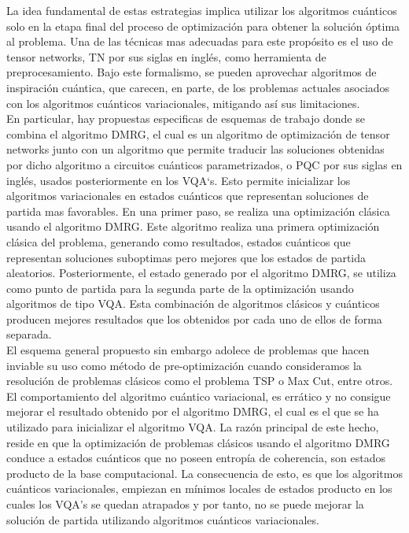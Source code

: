 \newpage

La idea fundamental de estas estrategias implica utilizar los algoritmos cuánticos solo en la etapa final del proceso de optimización para obtener la solución óptima al problema. Una de las técnicas mas adecuadas para este propósito es el uso de tensor networks, TN por sus siglas en inglés, como herramienta de preprocesamiento. Bajo este formalismo, se pueden aprovechar algoritmos de inspiración cuántica, que carecen, en parte, de los problemas actuales asociados con los algoritmos cuánticos variacionales, mitigando así sus limitaciones. \\

En particular, hay propuestas especificas de esquemas de trabajo donde se combina el algoritmo DMRG, el cual es un algoritmo de optimización de tensor networks junto con un algoritmo que permite traducir las soluciones obtenidas por dicho algoritmo a circuitos cuánticos parametrizados, o \mbox{PQC} por sus siglas en inglés, usados posteriormente en los VQA`s. Esto permite inicializar los algoritmos variacionales en estados cuánticos que representan soluciones de partida mas favorables. En una primer paso, se realiza una optimización clásica usando el algoritmo DMRG. Este algoritmo realiza una primera optimización clásica del problema, generando como resultados, estados cuánticos que representan soluciones suboptimas pero mejores que los estados de partida aleatorios. Posteriormente, el estado generado por el algoritmo DMRG, se utiliza como punto de partida para la segunda parte de la optimización usando algoritmos de tipo VQA. Esta combinación de algoritmos clásicos y cuánticos producen mejores resultados que los obtenidos por cada uno de ellos de forma separada. \\

El esquema general propuesto sin embargo adolece de problemas que hacen inviable su uso como método de pre-optimización cuando consideramos la resolución de problemas clásicos como el problema TSP o Max Cut, entre otros. El comportamiento del algoritmo cuántico variacional, es errático y no consigue mejorar el resultado obtenido por el algoritmo DMRG, el cual es el que se ha utilizado para inicializar el algoritmo VQA. La razón principal de este hecho, reside en que la optimización de problemas clásicos usando el algoritmo DMRG conduce a estados cuánticos que no poseen entropía de coherencia, son estados producto de la base computacional. La consecuencia de esto, es que los algoritmos cuánticos variacionales, empiezan en mínimos locales de estados producto en los cuales los VQA's se quedan atrapados y por tanto, no se puede mejorar la solución de partida utilizando algoritmos cuánticos variacionales. 

